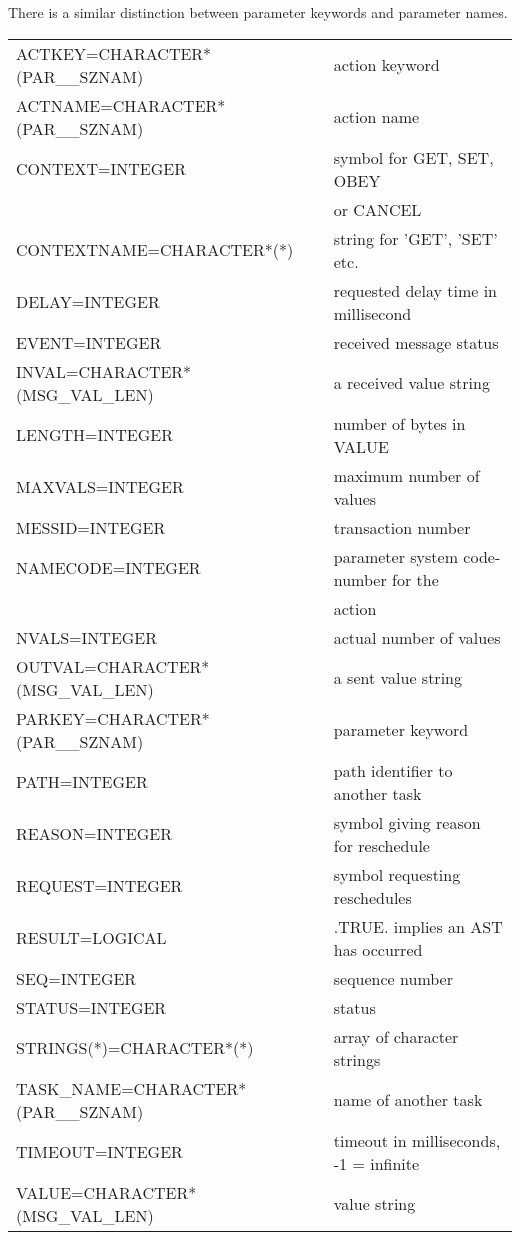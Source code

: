 \documentclass[twoside,11pt,nolof]{starlink}
\begin{document}
There is a similar distinction between parameter keywords and parameter
names.
\begin{small}
\begin{center}
\begin{tabular}{ll}
ACTKEY=CHARACTER*(PAR\_\_SZNAM)   &  action keyword \\
ACTNAME=CHARACTER*(PAR\_\_SZNAM)  &  action name \\
CONTEXT=INTEGER                  &  symbol for GET, SET, OBEY \\
                                 &  or CANCEL \\
CONTEXTNAME=CHARACTER*(*)        &  string for 'GET', 'SET' etc. \\
DELAY=INTEGER                    &  requested delay time in millisecond \\
EVENT=INTEGER                    &  received message status \\
INVAL=CHARACTER*(MSG\_VAL\_LEN)  &  a received value string \\
LENGTH=INTEGER                   &  number of bytes in VALUE \\
MAXVALS=INTEGER                  &  maximum number of values \\
MESSID=INTEGER                   &  transaction number \\
NAMECODE=INTEGER                 &  parameter system code-number for the \\
                                 &  action \\
NVALS=INTEGER                    &  actual number of values \\
OUTVAL=CHARACTER*(MSG\_VAL\_LEN) &  a sent value string \\
PARKEY=CHARACTER*(PAR\_\_SZNAM)   &  parameter keyword \\
PATH=INTEGER                     &  path identifier to another task \\
REASON=INTEGER                   &  symbol giving reason for reschedule \\
REQUEST=INTEGER                  &  symbol requesting reschedules \\
RESULT=LOGICAL                   &  .TRUE. implies an AST has occurred \\
SEQ=INTEGER                      &  sequence number \\
STATUS=INTEGER                   &  status \\
STRINGS(*)=CHARACTER*(*)         &  array of character strings \\
TASK\_NAME=CHARACTER*(PAR\_\_SZNAM) & name of another task \\
TIMEOUT=INTEGER                  &  timeout in milliseconds, -1 = infinite \\
VALUE=CHARACTER*(MSG\_VAL\_LEN)  &  value string \\
\end{tabular}
\end{center}
\end{small}
\end{document}
